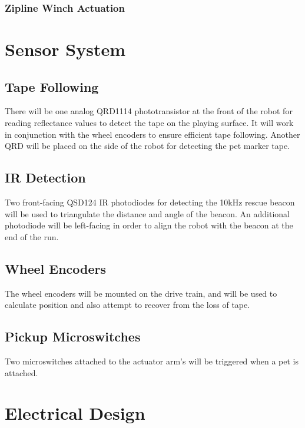 \documentclass[11pt, oneside]{article} %
\begin{document}
		\subsubsection{Zipline Winch Actuation}



\section{Sensor System}
	
	\subsection{Tape Following}
	
	There will be one analog QRD1114 phototransistor at the front of the robot for reading reflectance values to detect the tape on the playing surface. It will work in conjunction with the wheel encoders to ensure efficient tape following. Another QRD will be placed on the side of the robot for detecting the pet marker tape.
	
	\subsection{IR Detection}
	Two front-facing QSD124 IR photodiodes for detecting the 10kHz rescue beacon will be used to triangulate the distance and angle of the beacon. An additional photodiode will be left-facing in order to align the robot with the beacon at the end of the run.
	
	\subsection{Wheel Encoders}
	
	The wheel encoders will be mounted on the drive train, and will be used to calculate position and also attempt to recover from the loss of tape.
	
	\subsection{Pickup Microswitches}
	
	Two microswitches attached to the actuator arm's will be triggered when a pet is attached.
	

\section{Electrical Design}
\end{document}
